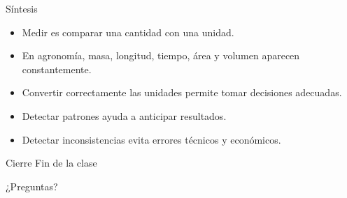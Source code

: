 \documentclass[aspectratio=169,10pt]{beamer}
\begin{document}
	\begin{frame}{Síntesis}
		\begin{itemize}[<+->]
			\item Medir es comparar una cantidad con una unidad.
			\item En agronomía, masa, longitud, tiempo, área y volumen aparecen constantemente.
			\item Convertir correctamente las unidades permite tomar decisiones adecuadas.
			\item Detectar patrones ayuda a anticipar resultados.
			\item Detectar inconsistencias evita errores técnicos y económicos.
		\end{itemize}
	\end{frame}
	
	\begin{frame}{Cierre}
		\centering
		\vspace{1cm}
		{\Huge Fin de la clase}
		
		\vspace{0.6cm}
		{\Large ¿Preguntas?}
	\end{frame}
	
\end{document}

